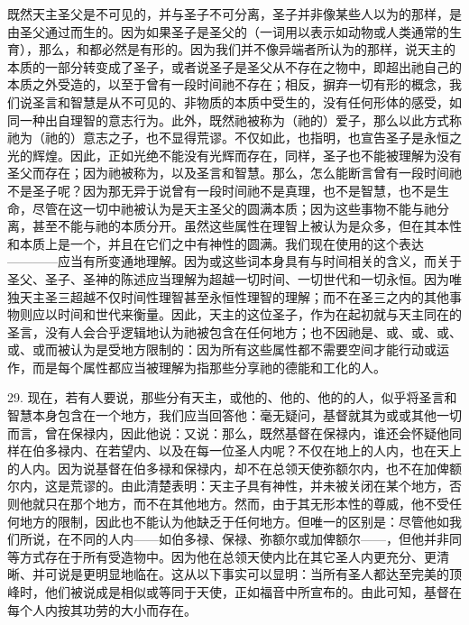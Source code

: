 既然天主圣父是不可见的，并与圣子不可分离，圣子并非像某些人以为的那样，是由圣父通过而生的。因为如果圣子是圣父的（一词用以表示如动物或人类通常的生育），那么，和都必然是有形的。因为我们并不像异端者所认为的那样，说天主的本质的一部分转变成了圣子，或者说圣子是圣父从不存在之物中，即超出祂自己的本质之外受造的，以至于曾有一段时间祂不存在；相反，摒弃一切有形的概念，我们说圣言和智慧是从不可见的、非物质的本质中受生的，没有任何形体的感受，如同一种出自理智的意志行为。此外，既然祂被称为（祂的）爱子，那么以此方式称祂为（祂的）意志之子，也不显得荒谬。不仅如此，也指明，也宣告圣子是永恒之光的辉煌。因此，正如光绝不能没有光辉而存在，同样，圣子也不能被理解为没有圣父而存在；因为祂被称为，以及圣言和智慧。那么，怎么能断言曾有一段时间祂不是圣子呢？因为那无异于说曾有一段时间祂不是真理，也不是智慧，也不是生命，尽管在这一切中祂被认为是天主圣父的圆满本质；因为这些事物不能与祂分离，甚至不能与祂的本质分开。虽然这些属性在理智上被认为是众多，但在其本性和本质上是一个，并且在它们之中有神性的圆满。我们现在使用的这个表达————应当有所变通地理解。因为或这些词本身具有与时间相关的含义，而关于圣父、圣子、圣神的陈述应当理解为超越一切时间、一切世代和一切永恒。因为唯独天主圣三超越不仅时间性理智甚至永恒性理智的理解；而不在圣三之内的其他事物则应以时间和世代来衡量。因此，天主的这位圣子，作为在起初就与天主同在的圣言，没有人会合乎逻辑地认为祂被包含在任何地方；也不因祂是、或、或、或、或、或而被认为是受地方限制的：因为所有这些属性都不需要空间才能行动或运作，而是每个属性都应当被理解为指那些分享祂的德能和工化的人。\par

29. 现在，若有人要说，那些分有天主，或他的、他的、他的的人，似乎将圣言和智慧本身包含在一个地方，我们应当回答他：毫无疑问，基督就其为或或其他一切而言，曾在保禄内，因此他说：又说：那么，既然基督在保禄内，谁还会怀疑他同样在伯多禄内、在若望内、以及在每一位圣人内呢？不仅在地上的人内，也在天上的人内。因为说基督在伯多禄和保禄内，却不在总领天使弥额尔内，也不在加俾额尔内，这是荒谬的。由此清楚表明：天主子具有神性，并未被关闭在某个地方，否则他就只在那个地方，而不在其他地方。然而，由于其无形本性的尊威，他不受任何地方的限制，因此也不能认为他缺乏于任何地方。但唯一的区别是：尽管他如我们所说，在不同的人内——如伯多禄、保禄、弥额尔或加俾额尔——，但他并非同等方式存在于所有受造物中。因为他在总领天使内比在其它圣人内更充分、更清晰、并可说是更明显地临在。这从以下事实可以显明：当所有圣人都达至完美的顶峰时，他们被说成是相似或等同于天使，正如福音中所宣布的。由此可知，基督在每个人内按其功劳的大小而存在。\par

